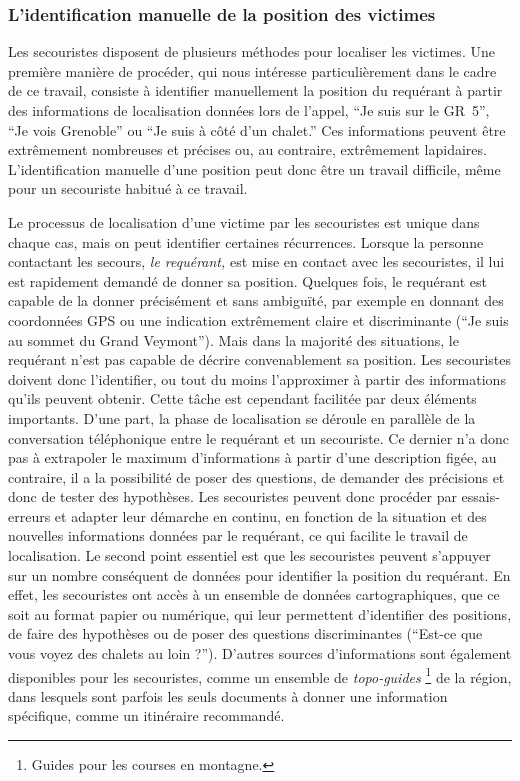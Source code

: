 \subsubsection{L'identification manuelle de la position des victimes}
\label{subsec:1-1-2-1}

Les secouristes disposent de plusieurs méthodes pour localiser les
victimes. Une première manière de procéder, qui nous intéresse
particulièrement dans le cadre de ce travail, consiste à identifier
manuellement la position du requérant à partir des informations de
localisation données lors de l'appel, \eg \enquote{Je suis sur le
  GR~5}, \enquote{Je vois Grenoble} ou \enquote{Je suis à côté d'un
  chalet.} Ces informations peuvent être extrêmement nombreuses et
précises ou, au contraire, extrêmement lapidaires. L'identification
manuelle d'une position peut donc être un travail difficile, même pour
un secouriste habitué à ce travail.

Le processus de localisation d'une victime par les secouristes est
unique dans chaque cas, mais on peut identifier certaines
récurrences. Lorsque la personne contactant les secours, \emph{le
  requérant,} est mise en contact avec les secouristes, il lui est
rapidement demandé de donner sa position. Quelques fois, le requérant
est capable de la donner précisément et sans ambiguïté, par exemple en
donnant des coordonnées GPS ou une indication extrêmement claire et
discriminante (\eg \enquote{Je suis au sommet du Grand Veymont}). Mais
dans la majorité des situations, le requérant n'est pas capable de
décrire convenablement sa position. Les secouristes doivent donc
l'identifier, ou tout du moins l'approximer à partir des informations
qu'ils peuvent obtenir. Cette tâche est cependant facilitée par deux
éléments importants. D'une part, la phase de localisation se déroule
en parallèle de la conversation téléphonique entre le requérant et un
secouriste. Ce dernier n'a donc pas à extrapoler le maximum
d'informations à partir d'une description figée, au contraire, il a la
possibilité de poser des questions, de demander des précisions et donc
de tester des hypothèses. Les secouristes peuvent donc procéder par
essais-erreurs et adapter leur démarche en continu, en fonction de la
situation et des nouvelles informations données par le requérant, ce
qui facilite le travail de localisation. Le second point essentiel est
que les secouristes peuvent s'appuyer sur un nombre conséquent de
données pour identifier la position du requérant. En effet, les
secouristes ont accès à un ensemble de données cartographiques, que ce
soit au format papier ou numérique, qui leur permettent d'identifier
des positions, de faire des hypothèses ou de poser des questions
discriminantes (\eg \enquote{Est-ce que vous voyez des chalets au loin
  ?}). D'autres sources d'informations sont également disponibles pour
les secouristes, comme un ensemble de \emph{topo-guides}
\footnote{Guides pour les courses en montagne.} de la région, dans
lesquels sont parfois les seuls documents à donner une information
spécifique, comme un itinéraire recommandé.

